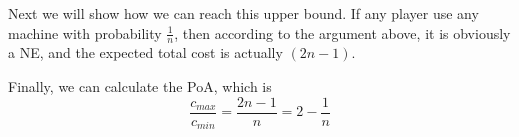 \documentclass[12pt]{cgtmd}
\begin{document}
\begin{enumerate}
        Next we will show how we can reach this upper bound. If any player use any machine with probability $\frac{1}{n}$, then according to the argument above, it is obviously a NE, and the expected total cost is actually $(2n - 1)$.

        Finally, we can calculate the PoA, which is
        $$\frac{c_{max}}{c_{min}} = \frac{2n - 1}{n} = 2 - \frac{1}{n}$$
\end{enumerate}
\end{document}
